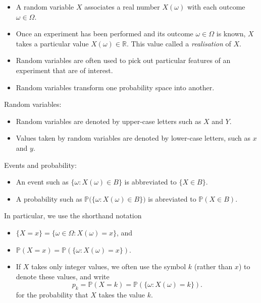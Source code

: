 \documentclass[lecture]{csm}
\newcommand{\R}{\mathbb{R}}
\newcommand{\prob}{\mathbb{P}}
\def\it{\item}
\def\bit{\begin{itemize}}
\def\eit{\end{itemize}}
\begin{document}
\bit
\it
A random variable $X$ associates a real number $X(\omega)$ with each outcome $\omega\in\Omega$.
\it
Once an experiment has been performed and its outcome $\omega\in\Omega$ is known, $X$ takes a particular value $X(\omega)\in\R$. This value called a \emph{realisation} of $X$.
\it
Random variables are often used to pick out particular features of an experiment that are of interest.
\it
Random variables transform one probability space into another.
\eit

\break %

\begin{remark}[Notation]
Random variables:
\bit
\it Random variables are denoted by upper-case letters such as $X$ and $Y$.
\it Values taken by random variables are denoted by lower-case letters, such as $x$ and $y$.
\eit
Events and probability:
\bit
\it An event such as $\{\omega:X(\omega)\in B\}$ is abbreviated to $\{X\in B\}$.
\it A probability such as $\prob\big(\{\omega:X(\omega)\in B\})$ is abreviated to $\prob(X\in B)$.
\eit
In particular, we use the shorthand notation
\bit
\it $\{X = x\} = \{\omega\in\Omega:X(\omega)=x\}$, and
\it $\prob(X = x) = \prob(\{\omega:X(\omega)=x\})$.
\eit
\end{remark}

\begin{remark}
\bit
\it If $X$ takes only integer values, we often use the symbol $k$ (rather than $x$) to denote these values, and write 
\[
p_k=\prob(X=k) = \prob(\{\omega: X(\omega)=k\}).
\]
for the probability that $X$ takes the value $k$.
\eit
\end{remark}

\break %
\end{document}
